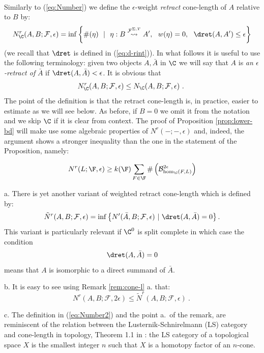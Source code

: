 \

Similarly to (\ref{eq:Number}) we define the $\epsilon$-weight {\em
  retract} cone-length of $A$ relative to $B$ by:
\begin{equation}\label{eq:Number2}
  N^{r}_{\C}(A, B;\mathcal{F}, \epsilon)=\inf\left\{  \#(\eta)\ \
    | \ \ \eta: B\stackrel{\mathcal{F}^{\Sigma,T}}{\rightsquigarrow} A',
    \  \ w(\eta)=0, \ \ \dret  (A, A') \leq \epsilon \right\}
 \end{equation}
 (we recall that $\dret$ is defined in (\ref{eq:d-rint})).  In what
 follows it is useful to use the following terminology: given two
 objects $A,\bar{A}$ in $\C$ we will say that $A$ is {\em an
   $\epsilon$-retract of} $\bar{A}$ if
 $\dret(A, \bar{A}) < \epsilon$.  It is obvious that
 $$N^{r}_{\C}(A, B;\mathcal{F}, \epsilon)
 \leq N_{\C}(A, B;\mathcal{F}, \epsilon)~.~$$ The point of the
 definition is that the retract cone-length is, in practice, easier to
 estimate as we will see below. As before, if $B=0$ we omit it from
 the notation and we skip $\C$ if it is clear from context. The proof
 of Proposition \ref{prop:lower-bd} will make use \pbred{of} some
 algebraic properties of $N^{r}( -; -, \epsilon)$ and, indeed, the
 argument shows a stronger inequality than the one in the statement of
 the Proposition, namely:
 
 \begin{equation}\label{eq:ineq-r-bar}
   N^{r}(L;\F,\epsilon)\geq k(\F) \sum_{F\in \F}\#
   \left( \mathcal{B}^{2\epsilon}_{\hom_{\C}(F,L)}\right)
\end{equation}

\begin{rem}
  a. There is yet another variant of weighted retract cone-length
  which is defined by:
  $$\tilde{N}^{r}(A, B;\mathcal{F}, \epsilon)=
  \inf\left\{ N'(\bar{A}, B;\mathcal{F}, \epsilon) \ | \ \dret
    (A,\bar{A})=0\right \}.$$ This variant is particularly relevant if
  $\C^{0}$ is split complete in which case the condition
  $$\dret (A,\bar{A})=0$$ means that $A$
  is isomorphic to a direct summand of $\bar{A}$.

  b. It is easy to see using Remark \ref{rem:cone-l} a. that:
  $$N^{r}(A, B;\mathcal{F}, 2\epsilon)\leq
  \tilde{N}^{r}(A, B;\mathcal{F}, \epsilon)~.~$$


  c. The definition in (\ref{eq:Number2}) and the point a.~of the
  remark, are reminiscent of the relation between the
  Lusternik-Schnirelmann (LS) category and cone-length in topology,
  Theorem 1.1 in \cite{Cor:cone-LS}: the LS category of a topological
  space $X$ is the smallest integer $n$ such that $X$ is a homotopy
  factor of an $n$-cone.

\end{rem}


